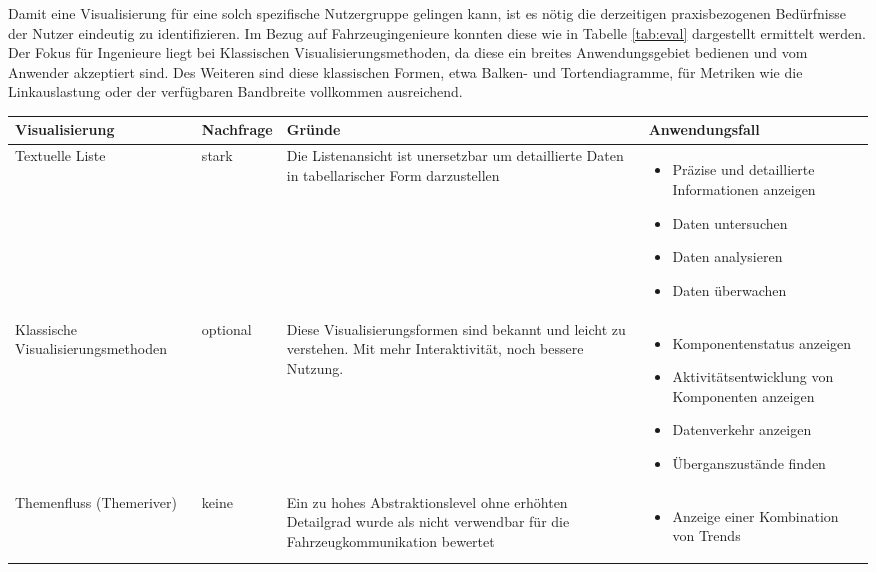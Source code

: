 \documentclass[draft=false
              ,paper=a4
              ,twoside=false
              ,fontsize=11pt
              ,headsepline
              ,BCOR10mm
              ,DIV11
              ]{scrbook}
\begin{document}
Damit eine Visualisierung für eine solch spezifische Nutzergruppe gelingen kann, ist es nötig die derzeitigen praxisbezogenen Bedürfnisse der Nutzer eindeutig zu identifizieren. Im Bezug auf Fahrzeugingenieure konnten diese wie in Tabelle \ref{tab:eval} dargestellt ermittelt werden. Der Fokus für Ingenieure liegt bei Klassischen Visualisierungsmethoden, da diese ein breites Anwendungsgebiet bedienen und vom Anwender akzeptiert sind. Des Weiteren sind diese klassischen Formen, etwa Balken- und Tortendiagramme, für Metriken wie die Linkauslastung oder der verfügbaren Bandbreite vollkommen ausreichend. 
\begin{table}[htbp]
  \begin{tabularx}{\textwidth}{X|l|X|p{5cm}}%
    \textbf{Visualisierung} & \textbf{Nachfrage} & \textbf{Gründe} & \textbf{Anwendungsfall} \\ \hline
    Textuelle Liste & stark & Die Listenansicht ist unersetzbar um detaillierte Daten in tabellarischer Form darzustellen & 
    \begin{itemize}[noitemsep,nolistsep]
      \item Präzise und detaillierte Informationen anzeigen
      \item Daten untersuchen
      \item Daten analysieren
      \item Daten überwachen
    \end{itemize} \\ \hline
    Klassische Visualisierungsmethoden & optional & Diese Visualisierungsformen sind bekannt und leicht zu verstehen. Mit mehr Interaktivität, noch bessere Nutzung. &
    \begin{itemize}[noitemsep,nolistsep]
      \item Komponentenstatus anzeigen
      \item Aktivitätsentwicklung von Komponenten anzeigen
      \item Datenverkehr anzeigen
      \item Überganszustände finden
    \end{itemize} \\ \hline
    Themenfluss (Themeriver) & keine & Ein zu hohes Abstraktionslevel ohne erhöhten Detailgrad wurde als nicht verwendbar für die Fahrzeugkommunikation bewertet &
    \begin{itemize}[noitemsep,nolistsep]
      \item Anzeige einer Kombination von Trends
    \end{itemize} \\ \hline

\end{tabularx}
\end{table}
\end{document}
